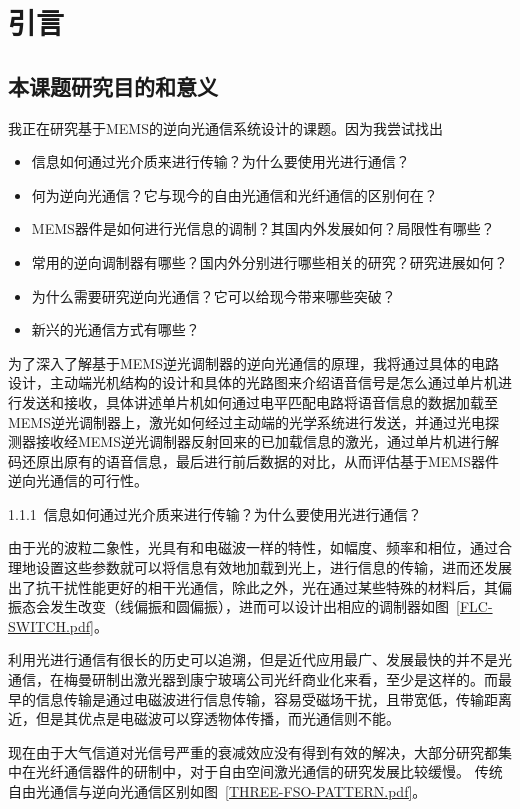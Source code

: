 \chapter{引言}\label{chap:introduction}

\section{本课题研究目的和意义}
我正在研究基于MEMS的逆向光通信系统设计的课题。因为我尝试找出
\begin{itemize}
	\item 信息如何通过光介质来进行传输？为什么要使用光进行通信？
	\item 何为逆向光通信？它与现今的自由光通信和光纤通信的区别何在？
	\item MEMS器件是如何进行光信息的调制？其国内外发展如何？局限性有哪些？
	\item 常用的逆向调制器有哪些？国内外分别进行哪些相关的研究？研究进展如何？
	\item 为什么需要研究逆向光通信？它可以给现今带来哪些突破？
	\item 新兴的光通信方式有哪些？
\end{itemize}

为了深入了解基于MEMS逆光调制器的逆向光通信的原理，我将通过具体的电路设计，主动端光机结构的设计和具体的光路图来介绍语音信号是怎么通过单片机进行发送和接收，具体讲述单片机如何通过电平匹配电路将语音信息的数据加载至MEMS逆光调制器上，激光如何经过主动端的光学系统进行发送，并通过光电探测器接收经MEMS逆光调制器反射回来的已加载信息的激光，通过单片机进行解码还原出原有的语音信息，最后进行前后数据的对比，从而评估基于MEMS器件逆向光通信的可行性。

1.1.1\ 信息如何通过光介质来进行传输？为什么要使用光进行通信？

由于光的波粒二象性，光具有和电磁波一样的特性，如幅度、频率和相位，通过合理地设置这些参数就可以将信息有效地加载到光上，进行信息的传输，进而还发展出了抗干扰性能更好的相干光通信\citep{Honghui.2013}，除此之外，光在通过某些特殊的材料后，其偏振态会发生改变（线偏振和圆偏振），进而可以设计出相应的调制器如图~\ref{FLC-SWITCH.pdf}。

利用光进行通信有很长的历史可以追溯，但是近代应用最广、发展最快的并不是光通信，在梅曼研制出激光器到康宁玻璃公司光纤商业化来看，至少是这样的。而最早的信息传输是通过电磁波进行信息传输，容易受磁场干扰，且带宽低，传输距离近，但是其优点是电磁波可以穿透物体传播，而光通信则不能。

现在由于大气信道对光信号严重的衰减效应没有得到有效的解决，大部分研究都集中在光纤通信器件的研制中，对于自由空间激光通信的研究发展比较缓慢。
传统自由光通信\citep{白帅.2015, 姜会林.2015}与逆向光通信区别如图~\ref{THREE-FSO-PATTERN.pdf}。


